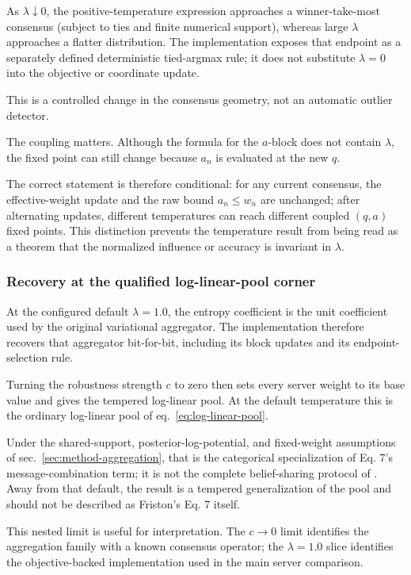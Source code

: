 \documentclass[
  english,
]{article}
\theoremstyle{plain}
\theoremstyle{definition}
\theoremstyle{remark}
\theoremstyle{definition}
\begin{document}
As \(\lambda\downarrow0\), the positive-temperature expression
approaches a winner-take-most consensus (subject to ties and finite
numerical support), whereas large \(\lambda\) approaches a flatter
distribution. The implementation exposes that endpoint as a separately
defined deterministic tied-argmax rule; it does not substitute
\(\lambda=0\) into the objective or coordinate update.

This is a controlled change in the consensus geometry, not an automatic
outlier detector.

The coupling matters. Although the formula for the \(a\)-block does not
contain \(\lambda\), the fixed point can still change because \(a_n\) is
evaluated at the new \(q\).

The correct statement is therefore conditional: for any current
consensus, the effective-weight update and the raw bound \(a_n\leq w_n\)
are unchanged; after alternating updates, different temperatures can
reach different coupled \((q,a)\) fixed points. This distinction
prevents the temperature result from being read as a theorem that the
normalized influence or accuracy is invariant in \(\lambda\).

\subsubsection{Recovery at the qualified log-linear-pool
corner}\label{sec:formalism-tempered-recovery}

At the configured default \(\lambda=1.0\), the entropy coefficient is
the unit coefficient used by the original variational aggregator. The
implementation therefore recovers that aggregator bit-for-bit, including
its block updates and its endpoint-selection rule.

Turning the robustness strength \(c\) to zero then sets every server
weight to its base value and gives the tempered log-linear pool. At the
default temperature this is the ordinary log-linear pool of
eq.~\ref{eq:log-linear-pool}.

Under the shared-support, posterior-log-potential, and fixed-weight
assumptions of sec.~\ref{sec:method-aggregation}, that is the
categorical specialization of Eq. 7's message-combination term; it is
not the complete belief-sharing protocol of
\citep{friston2024federated}. Away from that default, the result is a
tempered generalization of the pool and should not be described as
Friston's Eq. 7 itself.

This nested limit is useful for interpretation. The \(c\to0\) limit
identifies the aggregation family with a known consensus operator; the
\(\lambda=1.0\) slice identifies the objective-backed implementation
used in the main server comparison.
\end{document}
